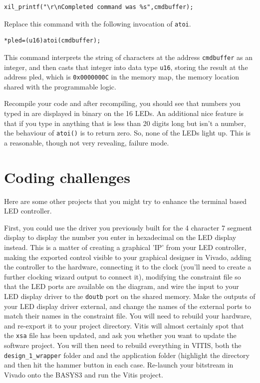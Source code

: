 \documentclass[../physical_computing.tex]{subfiles}
\begin{document}
\begin{verbatim}
xil_printf("\r\nCompleted command was %s",cmdbuffer);
\end{verbatim}

Replace this command with the following invocation of \texttt{atoi}.

\begin{verbatim}
*pled=(u16)atoi(cmdbuffer);
\end{verbatim}

This command interprets the string of characters at the address \texttt{cmdbuffer} as an integer, and
then casts that integer into data type \texttt{u16}, storing the result at the address pled, which is
\texttt{0x0000000C} in the memory map, the memory location shared with the programmable logic.

Recompile your code and after recompiling, you should see that numbers you typed in are displayed in 
binary on the 16 LEDs. An additional nice feature is that if you type in anything that is less than 
20 digits long but isn't a number, the behaviour of \texttt{atoi()} is to return zero. So, none of the
LEDs light up. This is a reasonable, though not very revealing, failure mode.

\section{Coding challenges}
\label{sec:codechallenge}

Here are some other projects that you might try to enhance the terminal based LED controller.

First, you could use the driver you previously built for the 4 character 7 segment display to 
display the number you enter in hexadecimal on the LED display instead. This is a matter of 
creating a graphical 'IP' from your LED controller, making the exported control visible to 
your graphical designer in Vivado, adding the controller to the hardware, connecting it to the
clock (you'll need to create a further clocking wizard output to connect it), modifying the 
constraint file so that the LED ports are available on the diagram, and wire the input to your
LED display driver to the \texttt{doutb} port on the shared memory. Make the outputs of your 
LED display driver external, and change the names of the external ports to match their names in 
the constraint file. You will need to rebuild your hardware, and re-export it to your project directory.
Vitis will almost certainly spot that the \texttt{xsa} file has been updated, and ask you whether 
you want to update the software project. You will then need to rebuild everything in VITIS, both
the \texttt{design\_1\_wrapper} folder and and the application folder (highlight the directory 
and then hit the hammer button in each case. Re-launch your bitstream in Vivado onto the BASYS3
and run the Vitis project.
\end{document}
